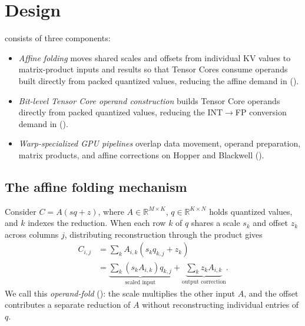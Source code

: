 \section{\sys{} Design}
\label{sec:design}

\sys{} consists of three components:
\begin{itemize}
  \item \emph{Affine folding} moves shared scales and offsets from individual KV values to matrix-product inputs and results so that Tensor Cores consume operands built directly from packed quantized values, reducing the affine demand in  ().
  \item \emph{Bit-level Tensor Core operand construction} builds Tensor Core operands directly from packed quantized values, reducing the INT$\to$FP conversion demand in  ().
  \item \emph{Warp-specialized GPU pipelines} overlap data movement, operand preparation, matrix products, and affine corrections on Hopper and Blackwell (). 
\end{itemize}

\subsection{The affine folding mechanism}
\label{sec:design-fold}


Consider $C=A(sq+z)$, where $A\in\mathbb{R}^{M\times K}$, $q\in\mathbb{R}^{K\times N}$ holds quantized values, and $k$ indexes the reduction.
When each row $k$ of $q$ shares a scale $s_k$ and offset $z_k$ across columns $j$, distributing reconstruction through the product gives
\begin{equation}
  \begin{aligned}
    C_{i,j} &= \sum_k A_{i,k}(s_kq_{k,j}+z_k) \\
      &= \underbrace{\sum_k(s_kA_{i,k})q_{k,j}}_{\text{scaled input}}+
         \underbrace{\sum_k z_kA_{i,k}}_{\text{output correction}}.
  \end{aligned}
  \label{eq:operand-fold}
\end{equation}
We call this \emph{operand-fold} (): the scale multiplies the other input $A$, and the offset contributes a separate reduction of $A$ without reconstructing individual entries of $q$.



